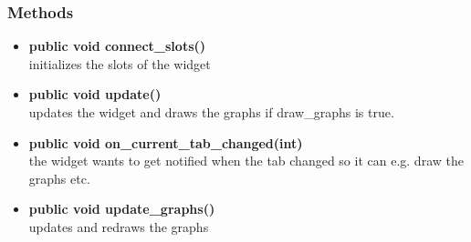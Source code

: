 \subsubsection{Methods}
\begin{itemize}
  \item \textbf{public void connect\_slots()}\\
  initializes the slots of the widget
  \item \textbf{public void update()}\\
  updates the widget and draws the graphs if draw\_graphs is true. 
  \item \textbf{public void on\_current\_tab\_changed(int)}\\
  the widget wants to get notified when the tab changed so it can e.g. draw the graphs etc.
  \item \textbf{public void update\_graphs()}\\
  updates and redraws the graphs
\end{itemize}

\newpage
